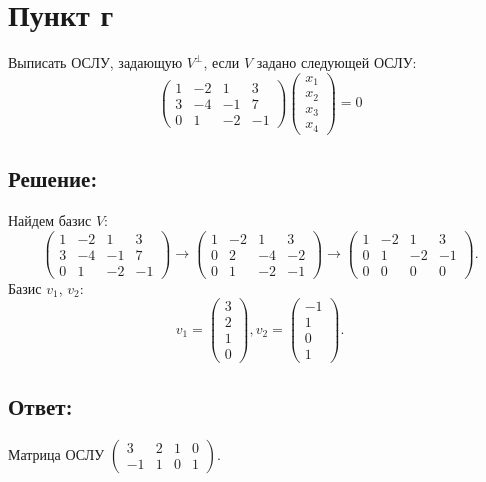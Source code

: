 \documentclass[12pt]{article}
\begin{document}
    \section*{Пункт г}
    Выписать ОСЛУ, задающую $V^\perp$, если $V$ задано следующей ОСЛУ:
    \[
        \begin{pmatrix}
            1 & -2 & 1  & 3  \\
            3 & -4 & -1 & 7  \\
            0 & 1  & -2 & -1
        \end{pmatrix}
        \begin{pmatrix}
            x_1 \\
            x_2 \\
            x_3 \\
            x_4
        \end{pmatrix}
        = 0
    \]

    \subsection*{Решение:}
    Найдем базис $V$:
    \[
        \begin{pmatrix}
            1 & -2 & 1  & 3  \\
            3 & -4 & -1 & 7  \\
            0 & 1  & -2 & -1
        \end{pmatrix}
        \rightarrow
        \begin{pmatrix}
            1 & -2 & 1  & 3  \\
            0 & 2  & -4 & -2 \\
            0 & 1  & -2 & -1
        \end{pmatrix}
        \rightarrow
        \begin{pmatrix}
            1 & -2 & 1  & 3  \\
            0 & 1  & -2 & -1 \\
            0 & 0  & 0  & 0
        \end{pmatrix} .
    \]
    Базис $v_1$, $v_2$:
    \[
        v_1 =
        \begin{pmatrix}
            3 \\
            2 \\
            1 \\
            0
        \end{pmatrix},
        v_2 =
        \begin{pmatrix}
            -1 \\
            1 \\
            0 \\
            1
        \end{pmatrix}.
    \]

    \subsection*{Ответ:}
    Матрица ОСЛУ
    $
    \begin{pmatrix}
        3 & 2 & 1 & 0 \\
        -1 & 1 & 0 & 1
    \end{pmatrix}
    $.
\end{document}
